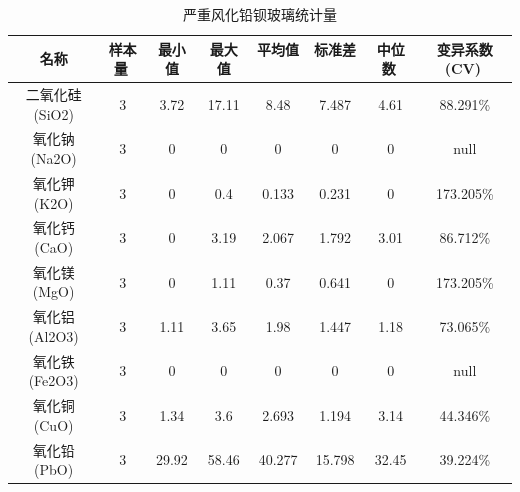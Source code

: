 \documentclass{my_paper}
\begin{document}
\begin{enumerate}
\begin{itemize}
    \begin{table}[ht]
        \centering
        \caption{严重风化铅钡玻璃统计量}
        \begin{tabular}{cccccccc}
        \toprule
        名称                   & 样本量                 & 最小值                  & 最大值                  & 平均值                 & 标准差                 & 中位数                 & 变异系数(CV)            \\
        \midrule
        二氧化硅(SiO2)           & 3                    & 3.72                 & 17.11                & 8.48                 & 7.487                & 4.61                 & 88.291\%             \\
        氧化钠(Na2O)            & 3                    & 0                    & 0                    & 0                    & 0                    & 0                    & null                 \\
        氧化钾(K2O)             & 3                    & 0                    & 0.4                  & 0.133                & 0.231                & 0                    & 173.205\%            \\
        氧化钙(CaO)             & 3                    & 0                    & 3.19                 & 2.067                & 1.792                & 3.01                 & 86.712\%             \\
        氧化镁(MgO)             & 3                    & 0                    & 1.11                 & 0.37                 & 0.641                & 0                    & 173.205\%            \\
        氧化铝(Al2O3)           & 3                    & 1.11                 & 3.65                 & 1.98                 & 1.447                & 1.18                 & 73.065\%             \\
        氧化铁(Fe2O3)           & 3                    & 0                    & 0                    & 0                    & 0                    & 0                    & null                 \\
        氧化铜(CuO)             & 3                    & 1.34                 & 3.6                  & 2.693                & 1.194                & 3.14                 & 44.346\%             \\
        氧化铅(PbO)             & 3                    & 29.92                & 58.46                & 40.277               & 15.798               & 32.45                & 39.224\%             \\

\end{tabular}
\end{table}
\end{itemize}
\end{enumerate}
\end{document}
